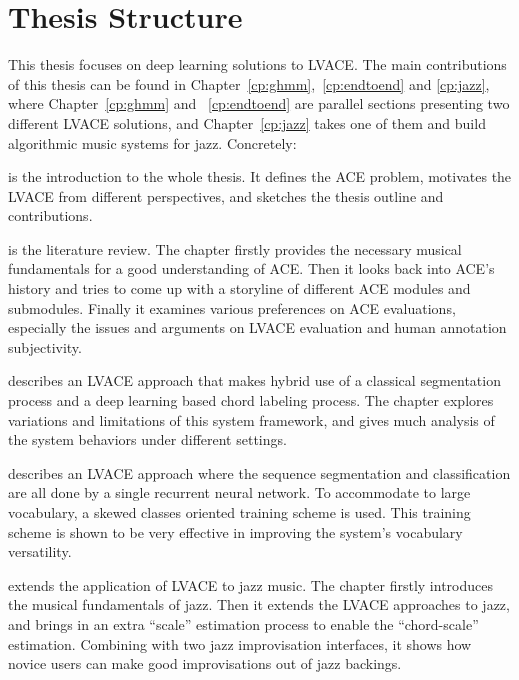 \section{Thesis Structure} \label{sec:1-outline}
This thesis focuses on deep learning solutions to LVACE. The main contributions of this thesis can be found in Chapter~\ref{cp:ghmm},~\ref{cp:endtoend} and \ref{cp:jazz}, where Chapter~\ref{cp:ghmm} and ~\ref{cp:endtoend} are parallel sections presenting two different LVACE solutions, and Chapter~\ref{cp:jazz} takes one of them and build algorithmic music systems for jazz. Concretely:

 is the introduction to the whole thesis. It defines the ACE problem, motivates the LVACE from different perspectives, and sketches the thesis outline and contributions.

 is the literature review. The chapter firstly provides the necessary musical fundamentals for a good understanding of ACE. Then it looks back into ACE's history and tries to come up with a storyline of different ACE modules and submodules. Finally it examines various preferences on ACE evaluations, especially the issues and arguments on LVACE evaluation and human annotation subjectivity.

 describes an LVACE approach that makes hybrid use of a classical segmentation process and a deep learning based chord labeling process. The chapter explores variations and limitations of this system framework, and gives much analysis of the system behaviors under different settings.

 describes an LVACE approach where the sequence segmentation and classification are all done by a single recurrent neural network. To accommodate to large vocabulary, a skewed classes oriented training scheme is used. This training scheme is shown to be very effective in improving the system's vocabulary versatility.

 extends the application of LVACE to jazz music. The chapter firstly introduces the musical fundamentals of jazz. Then it extends the LVACE approaches to jazz, and brings in an extra ``scale'' estimation process to enable the ``chord-scale'' estimation. Combining with two jazz improvisation interfaces, it shows how novice users can make good improvisations out of jazz backings.

